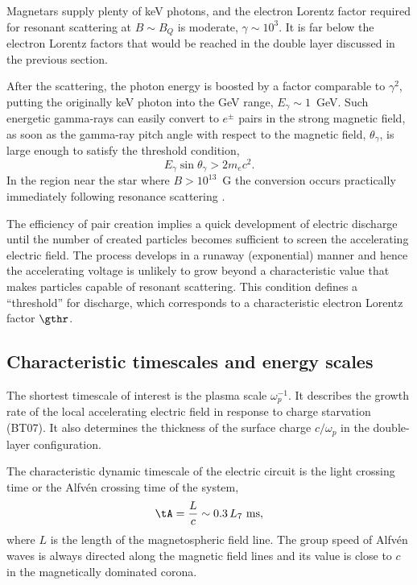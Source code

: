 Magnetars supply plenty of keV photons, and the electron Lorentz factor required
for resonant scattering at $B\sim B_Q$ is moderate, $\gamma \sim 10^{3}$. It is
far below the electron Lorentz factors that would be reached in the double layer
discussed in the previous section.

After the scattering, the photon energy is boosted by a factor comparable to
$\gamma^2$, putting the originally keV photon into the GeV range, $E_\gamma\sim
1$~GeV. Such energetic gamma-rays can easily convert to $e^{\pm}$ pairs in the
strong magnetic field, as soon as the gamma-ray pitch angle with respect to the
magnetic field, $\theta_\gamma$, is large enough to satisfy the threshold
condition,
\begin{equation}
  \label{eq:threshold}
  E_\gamma\sin\theta_\gamma > 2m_{e}c^2.
\end{equation}
In the region near the star where $B>10^{13}$~G the conversion occurs practically
immediately following resonance scattering \citep{2013ApJ...762...13B}.

The efficiency of pair creation implies a quick development of electric discharge
until the number of created particles becomes sufficient to screen the accelerating
electric field. The process develops in a runaway (exponential) manner and hence
the accelerating voltage is unlikely to grow beyond a characteristic value that
makes particles capable of resonant scattering. This condition defines a ``threshold''
for discharge, which corresponds to a characteristic electron Lorentz factor $\gthr$.


\subsection{Characteristic timescales and energy scales}


The shortest timescale of interest is the plasma scale $\omega_p^{-1}$. It
describes the growth rate of the local accelerating electric field in response
to charge starvation (BT07). It also determines the thickness of the surface
charge $c/\omega_p$ in the double-layer configuration.

The characteristic dynamic timescale of the electric circuit is the light crossing
time or the Alfv\'en crossing time of the system,
\begin{equation}
   \tA= \frac{L}{c}\sim 0.3\,L_7 {\rm~ms},
\end{equation}
where $L$ is the length of the magnetospheric field line. The group speed of Alfv\'en
waves is always directed along the magnetic field lines and its value is close to $c$
in the magnetically dominated corona.

